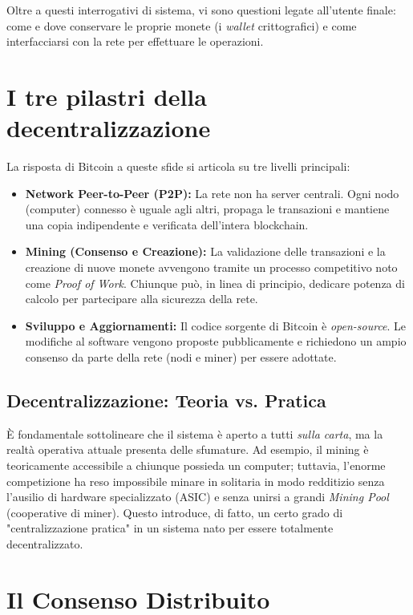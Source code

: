 Oltre a questi interrogativi di sistema, vi sono questioni legate all'utente finale: come e dove conservare le proprie monete (i \textit{wallet} crittografici) e come interfacciarsi con la rete per effettuare le operazioni.

\section{I tre pilastri della decentralizzazione}
La risposta di Bitcoin a queste sfide si articola su tre livelli principali:
\begin{itemize}
    \item \textbf{Network Peer-to-Peer (P2P):} La rete non ha server centrali. Ogni nodo (computer) connesso è uguale agli altri, propaga le transazioni e mantiene una copia indipendente e verificata dell'intera blockchain.
    \item \textbf{Mining (Consenso e Creazione):} La validazione delle transazioni e la creazione di nuove monete avvengono tramite un processo competitivo noto come \textit{Proof of Work}. Chiunque può, in linea di principio, dedicare potenza di calcolo per partecipare alla sicurezza della rete.
    \item \textbf{Sviluppo e Aggiornamenti:} Il codice sorgente di Bitcoin è \textit{open-source}. Le modifiche al software vengono proposte pubblicamente e richiedono un ampio consenso da parte della rete (nodi e miner) per essere adottate.
\end{itemize}

\subsection*{Decentralizzazione: Teoria vs. Pratica}
È fondamentale sottolineare che il sistema è aperto a tutti \textit{sulla carta}, ma la realtà operativa attuale presenta delle sfumature. Ad esempio, il mining è teoricamente accessibile a chiunque possieda un computer; tuttavia, l'enorme competizione ha reso impossibile minare in solitaria in modo redditizio senza l'ausilio di hardware specializzato (ASIC) e senza unirsi a grandi \textit{Mining Pool} (cooperative di miner). Questo introduce, di fatto, un certo grado di "centralizzazione pratica" in un sistema nato per essere totalmente decentralizzato.

\section{Il Consenso Distribuito}

